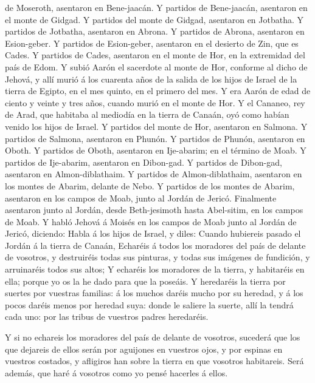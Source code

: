 de Moseroth, asentaron en Bene-jaacán.  Y partidos de
Bene-jaacán, asentaron en el monte de Gidgad.  Y partidos
del monte de Gidgad, asentaron en Jotbatha.  Y partidos de
Jotbatha, asentaron en Abrona.  Y partidos de Abrona,
asentaron en Esion-geber.  Y partidos de Esion-geber,
asentaron en el desierto de Zin, que es Cades.  Y partidos
de Cades, asentaron en el monte de Hor, en la extremidad del país de
Edom.  Y subió Aarón el sacerdote al monte de Hor, conforme
al dicho de Jehová, y allí murió á los cuarenta años de la salida de los
hijos de Israel de la tierra de Egipto, en el mes quinto, en el primero
del mes.  Y era Aarón de edad de ciento y veinte y tres
años, cuando murió en el monte de Hor.  Y el Cananeo, rey
de Arad, que habitaba al mediodía en la tierra de Canaán, oyó como
habían venido los hijos de Israel.  Y partidos del monte de
Hor, asentaron en Salmona.  Y partidos de Salmona,
asentaron en Phunón.  Y partidos de Phunón, asentaron en
Oboth.  Y partidos de Oboth, asentaron en Ije-abarim; en el
término de Moab.  Y partidos de Ije-abarim, asentaron en
Dibon-gad.  Y partidos de Dibon-gad, asentaron en
Almon-diblathaim.  Y partidos de Almon-diblathaim,
asentaron en los montes de Abarim, delante de Nebo.  Y
partidos de los montes de Abarim, asentaron en los campos de Moab, junto
al Jordán de Jericó.  Finalmente asentaron junto al Jordán,
desde Beth-jesimoth hasta Abel-sitim, en los campos de Moab.
 Y habló Jehová á Moisés en los campos de Moab junto al
Jordán de Jericó, diciendo:  Habla á los hijos de Israel, y
diles: Cuando hubiereis pasado el Jordán á la tierra de Canaán,
 Echaréis á todos los moradores del país de delante de
vosotros, y destruiréis todas sus pinturas, y todas sus imágenes de
fundición, y arruinaréis todos sus altos;  Y echaréis los
moradores de la tierra, y habitaréis en ella; porque yo os la he dado
para que la poseáis.  Y heredaréis la tierra por suertes
por vuestras familias: á los muchos daréis mucho por su heredad, y á los
pocos daréis menos por heredad suya: donde le saliere la suerte, allí la
tendrá cada uno: por las tribus de vuestros padres heredaréis.

 Y si no echareis los moradores del país de delante de
vosotros, sucederá que los que dejareis de ellos serán por aguijones en
vuestros ojos, y por espinas en vuestros costados, y afligiros han sobre
la tierra en que vosotros habitareis.  Será además, que
haré á vosotros como yo pensé hacerles á ellos.

